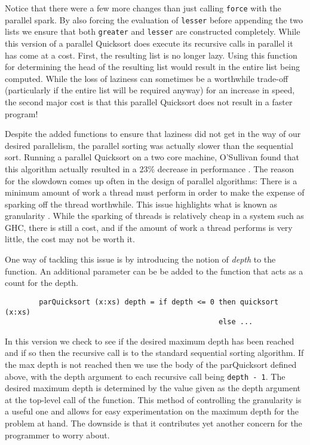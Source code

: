 Notice that there were a few more changes than just calling \verb=force= with
the parallel spark. By also forcing the evaluation of \verb=lesser= before
appending the two lists we ensure that both \verb=greater= and \verb=lesser=
are constructed completely. While this version of a parallel Quicksort does
execute its recursive calls in parallel it has come at a cost. First, the
resulting list is no longer lazy. Using this function for determining the head
of the resulting list would result in the entire list being computed. While
the loss of laziness can sometimes be a worthwhile trade-off (particularly
if the entire list will be required anyway) for an increase in speed, the
second major cost is that this parallel Quicksort does not result in a faster
program!

    Despite the added functions to ensure that laziness did not get in the way
of our desired parallelism, the parallel sorting was actually slower than the
sequential sort. Running a parallel Quicksort on a two core machine, O'Sullivan
found that this algorithm actually resulted in a $23\%$ decrease in
performance \citep{realWorld}. The reason for the slowdown comes up often in the
design of parallel algorithms: There is a minimum amount of work a thread must
perform in order to make the expense of sparking off the thread worthwhile. This
issue highlights what is known as granularity \citep{dutchBook}. While the sparking
of threads is relatively cheap in a system such as GHC, there is still a cost,
and if the amount of work a thread performs is very little, the cost may not be
worth it.

    One way of tackling this issue is by introducing the notion of \emph{depth}
to the function. An additional parameter can be be added to the function that
acts as a count for the depth.

\begin{verbatim}
        parQuicksort (x:xs) depth = if depth <= 0 then quicksort (x:xs)
                                                  else ...
\end{verbatim}

    In this version we check to see if the desired maximum depth has been
reached and if so then the recursive call is to the standard sequential sorting
algorithm. If the max depth is not reached then we use the body of the
parQuicksort defined above, with the depth argument to each recursive call being
\verb=depth - 1=. The desired maximum depth is determined by the value given as
the depth argument at the top-level call of the function. This method of
controlling the granularity is a useful one and allows for easy experimentation
on the maximum depth for the problem at hand. The downside is that it
contributes yet another concern for the programmer to worry about.


